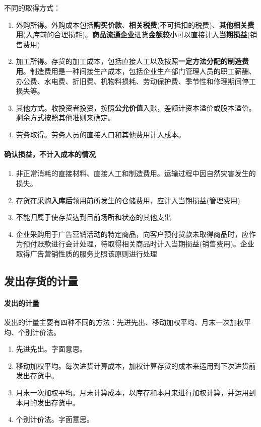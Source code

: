 \documentclass[UTF8,12pt]{ctexart}
\numberwithin{equation}{section} %
\numberwithin{figure}{section}
\numberwithin{table}{section}
\begin{document}
	不同的取得方式：
	\begin{enumerate}
		\item 外购所得。外购成本包括\textbf{购买价款}、\textbf{相关税费}(不可抵扣的税费)、\textbf{其他相关费用}(入库前的合理损耗)。\textbf{商品流通企业}进货\textbf{金额较小}可以直接计入\textbf{当期损益}(销售费用)
		
		\item 加工所得。存货的加工成本，包括直接人工以及按照\textbf{一定方法分配的制造费用}。制造费用是一种间接生产成本，包括企业生产部门管理人员的职工薪酬、办公费、水电费、折旧费、机物料损耗、劳动保护费、季节性和修理期间停工损失等。
		
		\item 其他方式。收投资者投资，按照\textbf{公允价值}入账，差额计资本溢价或股本溢价。剩余方式按照其他准则来确定。
		
		\item 劳务取得。劳务人员的直接人口和其他费用计入成本。
	\end{enumerate}
	
	\paragraph{确认损益，不计入成本的情况}
	\begin{enumerate}
		\item 非正常消耗的直接材料、直接人工和制造费用。运输过程中因自然灾害发生的损失。
		
		\item 存货在采购\textbf{入库后}领用前所发生的仓储费用，应计入当期损益(管理费用)
		
		\item 不能归属于使存货达到目前场所和状态的其他支出
		
		\item 企业采购用于广告营销活动的特定商品，向客户预付货款未取得商品时，应作为预付账款进行会计处理，待取得相关商品时计入当期损益(销售费用)。企业取得广告营销性质的服务比照该原则进行处理 
	\end{enumerate}
	
	\subsection{发出存货的计量}
	\paragraph{发出的计量} 发出的计量主要有四种不同的方法：先进先出、移动加权平均、月末一次加权平均、个别计价法。
	\begin{enumerate}
		\item 先进先出。字面意思。
		
		\item 移动加权平均。每次进货计算成本，加权计算存货的成本来运用到下次进货前发出存货中。
		
		\item 月末一次加权平均。月末计算成本，以库存和本月来进行加权计算，并运用到本月的发出存货中。
		
		\item 个别计价法。字面意思。
	\end{enumerate}
	
\end{document}
